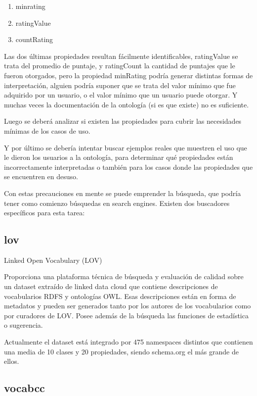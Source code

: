 \begin{enumerate}
\item minrating
\item ratingValue
\item countRating
\end{enumerate}


Las dos últimas propiedades resultan fácilmente identificables, ratingValue se trata del promedio de puntaje, y ratingCount 
la cantidad de puntajes que le fueron otorgados, pero la propiedad minRating podría generar distintas formas de interpretación, 
alguien podría suponer que se trata del valor mínimo que fue adquirido por un usuario, o el valor mínimo que un usuario puede 
otorgar. Y muchas veces la documentación de la ontología (si es que existe) no es suficiente.

Luego se deberá analizar si existen las propiedades para cubrir las necesidades mínimas de los casos de uso.

Y por último se debería intentar buscar ejemplos reales que muestren el uso que le dieron los usuarios a la ontología, para 
determinar qué propiedades están incorrectamente interpretadas o también para los casos donde las propiedades que se encuentren 
en desuso.

Con estas precauciones en mente se puede emprender la búsqueda, que podría tener como comienzo búsquedas en  search engines. 
Existen dos buscadores específicos para esta tarea:

\subsection{lov}

Linked Open Vocabulary (LOV)

Proporciona una plataforma técnica de búsqueda y evaluación de calidad sobre un dataset extraído de linked data cloud que contiene descripciones de vocabularios RDFS 
y ontologías OWL. Esas descripciones están en forma de metadatos y pueden ser generados tanto por los autores de los vocabularios como por curadores de LOV.
Posee además de la búsqueda las funciones de estadística o sugerencia.

Actualmente el dataset está integrado por 475 namespaces distintos que contienen una media de 10 clases y 20 propiedades, siendo schema.org el más grande de ellos.

\subsection{vocabcc}

